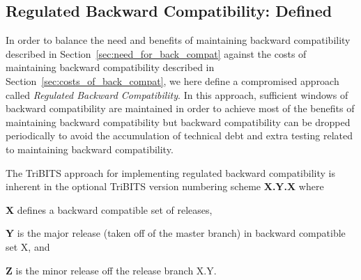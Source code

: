 \documentclass[11pt]{SANDreport}
\begin{document}
%
{}\subsection{Regulated Backward Compatibility: Defined}
\label{sec:defined_reg_back_compat}
%

In order to balance the need and benefits of maintaining backward
compatibility described in Section~\ref{sec:need_for_back_compat}
against the costs of maintaining backward compatibility described in
Section~\ref{sec:costs_of_back_compat}, we here define a compromised
approach called {}\textit{Regulated Backward Compatibility}.  In this
approach, sufficient windows of backward compatibility are maintained
in order to achieve most of the benefits of maintaining backward
compatibility but backward compatibility can be dropped periodically
to avoid the accumulation of technical debt and extra testing related
to maintaining backward compatibility.

The TriBITS approach for implementing regulated backward compatibility
is inherent in the optional TriBITS version numbering scheme
{}\textbf{X.Y.X} where
%
\begin{compactitem}
%
{}\item\textbf{X} defines a backward compatible set of releases,
%
{}\item\textbf{Y} is the major release (taken off of the master
branch) in backward compatible set X, and
%
{}\item\textbf{Z} is the minor release off the release branch X.Y.
%
\end{compactitem}

\begin{figure}
\begin{center}
\end{center}
\end{figure}
\end{document}
